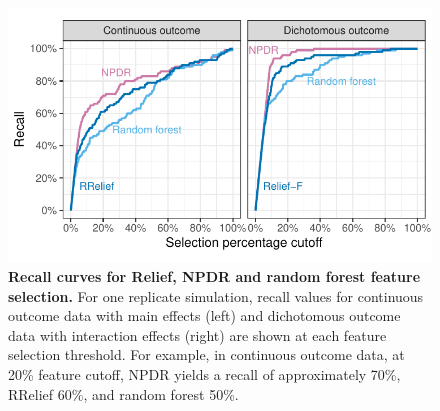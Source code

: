 \documentclass{article}
\begin{document}
\begin{figure}[!tbp]
\centerline{\includegraphics[trim = 0 0 0 0, width=1\textwidth]{../figs/recall_compare_1.pdf}}
\caption{{\bf Recall curves for Relief, NPDR and random forest feature selection.} For one replicate simulation, recall values for continuous outcome data with main effects (left) and dichotomous outcome data with interaction effects (right) are shown at each feature selection threshold. For example, in continuous outcome data, at 20\% feature cutoff, NPDR yields a recall of approximately 70\%, RRelief 60\%, and random forest 50\%.}
\label{fig:npdr_relief}
\end{figure}
\end{document}

